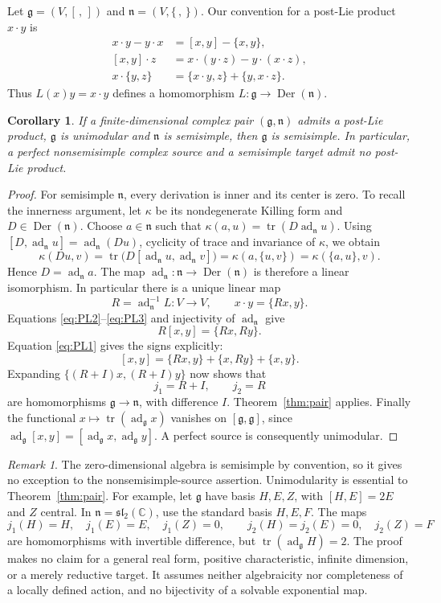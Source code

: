 \documentclass[11pt]{amsart}
\newtheorem{corollary}[theorem]{Corollary}
\theoremstyle{remark}
\newtheorem{remark}[theorem]{Remark}
\newcommand{\g}{\mathfrak g}
\newcommand{\n}{\mathfrak n}
\newcommand{\C}{\mathbb C}
\DeclareMathOperator{\ad}{ad}
\DeclareMathOperator{\tr}{tr}
\DeclareMathOperator{\Der}{Der}
\begin{document}
Let \(\g=(V,[\, ,\,])\) and \(\n=(V,\{\, ,\,\})\).
Our convention for a post-Lie product \(x\cdot y\) is
\begin{align}
 x\cdot y-y\cdot x&=[x,y]-\{x,y\},\label{eq:PL1}\\
 [x,y]\cdot z&=x\cdot(y\cdot z)-y\cdot(x\cdot z),\label{eq:PL2}\\
 x\cdot\{y,z\}&=\{x\cdot y,z\}+\{y,x\cdot z\}.\label{eq:PL3}
\end{align}
Thus \(L(x)y=x\cdot y\) defines a homomorphism
\(L:\g\to\Der(\n)\).

\begin{corollary}\label{cor:postlie}
If a finite-dimensional complex pair \((\g,\n)\) admits a post-Lie
product, \(\g\) is unimodular and \(\n\) is semisimple, then
\(\g\) is semisimple.  In particular, a perfect nonsemisimple complex
source and a semisimple target admit no post-Lie product.
\end{corollary}

\begin{proof}
For semisimple \(\n\), every derivation is inner and its center is
zero.  To recall the innerness argument, let \(\kappa\) be its
nondegenerate Killing form and \(D\in\Der(\n)\).
Choose \(a\in\n\) such that
\(\kappa(a,u)=\tr(D\ad_{\n}u)\).
Using \([D,\ad_{\n}u]=\ad_{\n}(Du)\), cyclicity of trace and
invariance of \(\kappa\), we obtain
\[
 \kappa(Du,v)
 =\tr\bigl(D[\ad_{\n}u,\ad_{\n}v]\bigr)
 =\kappa(a,\{u,v\})=\kappa(\{a,u\},v).
\]
Hence \(D=\ad_{\n}a\).
The map \(\ad_{\n}:\n\to\Der(\n)\) is therefore a linear
isomorphism.  In particular there is a unique linear map
\[
 R=\ad_{\n}^{-1}L:V\longrightarrow V,\qquad
 x\cdot y=\{Rx,y\}.
\]
Equations \eqref{eq:PL2}--\eqref{eq:PL3} and injectivity of
\(\ad_{\n}\) give
\[
 R[x,y]=\{Rx,Ry\}.
\]
Equation \eqref{eq:PL1} gives the signs explicitly:
\[
 [x,y]=\{Rx,y\}+\{x,Ry\}+\{x,y\}.
\]
Expanding \(\{(R+I)x,(R+I)y\}\) now shows that
\[
 j_1=R+I,\qquad j_2=R
\]
are homomorphisms \(\g\to\n\), with difference \(I\).
Theorem~\ref{thm:pair} applies.
Finally the functional \(x\mapsto\tr(\ad_{\g}x)\) vanishes on
\([\g,\g]\), since
\(\ad_{\g}[x,y]=[\ad_{\g}x,\ad_{\g}y]\).
A perfect source is consequently unimodular.
\end{proof}

\begin{remark}
The zero-dimensional algebra is semisimple by convention, so it gives
no exception to the nonsemisimple-source assertion.
Unimodularity is essential to Theorem~\ref{thm:pair}.
For example, let \(\g\) have basis \(H,E,Z\), with
\([H,E]=2E\) and \(Z\) central.
In \(\n=\mathfrak{sl}_2(\C)\), use the standard basis \(H,E,F\).
The maps
\[
 j_1(H)=H,\quad j_1(E)=E,\quad j_1(Z)=0,\qquad
 j_2(H)=j_2(E)=0,\quad j_2(Z)=F
\]
are homomorphisms with invertible difference, but
\(\tr(\ad_{\g}H)=2\).
The proof makes no claim for a general real form, positive
characteristic, infinite dimension, or a merely reductive target.
It assumes neither algebraicity nor completeness of a locally
defined action, and no bijectivity of a solvable exponential map.
\end{remark}
\end{document}
